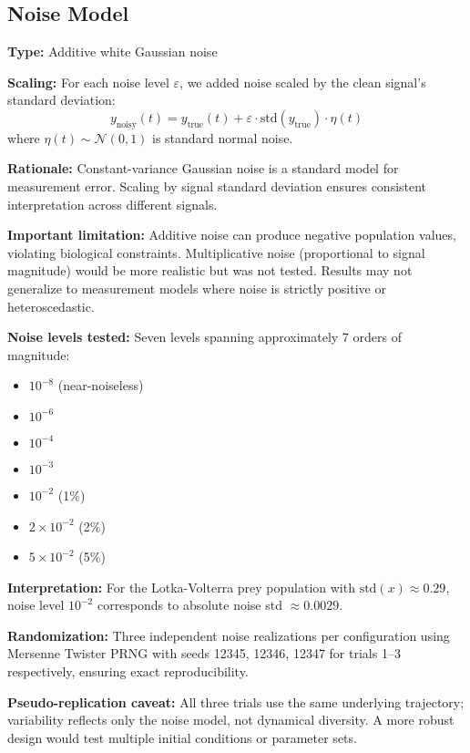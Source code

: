 \subsection{Noise Model}
\label{sec:noise_model}

\textbf{Type:} Additive white Gaussian noise

\textbf{Scaling:} For each noise level $\varepsilon$, we added noise scaled by the clean signal's standard deviation:
\begin{equation}
y_{\text{noisy}}(t) = y_{\text{true}}(t) + \varepsilon \cdot \text{std}(y_{\text{true}}) \cdot \eta(t)
\end{equation}
where $\eta(t) \sim \mathcal{N}(0, 1)$ is standard normal noise.

\textbf{Rationale:} Constant-variance Gaussian noise is a standard model for measurement error. Scaling by signal standard deviation ensures consistent interpretation across different signals.

\textbf{Important limitation:} Additive noise can produce negative population values, violating biological constraints. Multiplicative noise (proportional to signal magnitude) would be more realistic but was not tested. Results may not generalize to measurement models where noise is strictly positive or heteroscedastic.

\textbf{Noise levels tested:} Seven levels spanning approximately 7 orders of magnitude:
\begin{itemize}
    \item $10^{-8}$ (near-noiseless)
    \item $10^{-6}$
    \item $10^{-4}$
    \item $10^{-3}$
    \item $10^{-2}$ (1\%)
    \item $2 \times 10^{-2}$ (2\%)
    \item $5 \times 10^{-2}$ (5\%)
\end{itemize}

\textbf{Interpretation:} For the Lotka-Volterra prey population with $\text{std}(x) \approx 0.29$, noise level $10^{-2}$ corresponds to absolute noise std $\approx 0.0029$.

\textbf{Randomization:} Three independent noise realizations per configuration using Mersenne Twister PRNG with seeds 12345, 12346, 12347 for trials 1--3 respectively, ensuring exact reproducibility.

\textbf{Pseudo-replication caveat:} All three trials use the same underlying trajectory; variability reflects only the noise model, not dynamical diversity. A more robust design would test multiple initial conditions or parameter sets.

